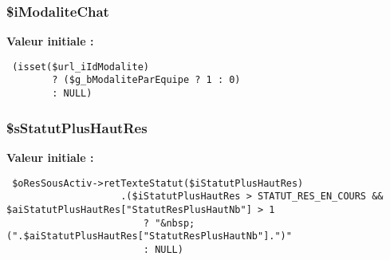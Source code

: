 \subsubsection{\setlength{\rightskip}{0pt plus 5cm}\$iModaliteChat}\label{tableau__bord_8php_a65aa6851049308964e691986bd335a1}


\textbf{Valeur initiale :}

\begin{Code}\begin{verbatim} (isset($url_iIdModalite)
        ? ($g_bModaliteParEquipe ? 1 : 0)
        : NULL)
\end{verbatim}
\end{Code}
\subsubsection{\setlength{\rightskip}{0pt plus 5cm}\$sStatutPlusHautRes}\label{tableau__bord_8php_1e744ba9d955763114be9335ae6143ed}


\textbf{Valeur initiale :}

\begin{Code}\begin{verbatim} $oResSousActiv->retTexteStatut($iStatutPlusHautRes)
                    .($iStatutPlusHautRes > STATUT_RES_EN_COURS && $aiStatutPlusHautRes["StatutResPlusHautNb"] > 1
                        ? "&nbsp;(".$aiStatutPlusHautRes["StatutResPlusHautNb"].")"
                        : NULL)
\end{verbatim}
\end{Code}
